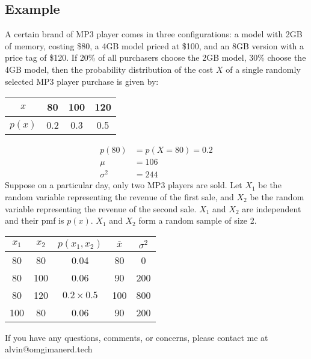 \documentclass[letterpaper, 12pt]{math}
\begin{document}
\subsection*{Example}
A certain brand of MP3 player comes in three configurations: a model with 2GB
of memory, costing \$80, a 4GB model priced at \$100, and an 8GB version with
a price tag of \$120. If 20\% of all purchasers choose the 2GB model, 30\%
choose the 4GB model, then the probability distribution of the cost \( X \) of
a single randomly selected MP3 player purchase is given by:
\begin{center}
  \begin{tabular}{|c|c|c|c|}
    \hline
    \( x \) & 80 & 100 & 120 \\
    \hline
    \( p(x) \) & 0.2 & 0.3 & 0.5 \\
    \hline
  \end{tabular}
\end{center}
\begin{align*}
  p(80) &= p(X=80) = 0.2 \\
  \mu &= 106 \\
  \sigma^{2} &= 244
\end{align*}
Suppose on a particular day, only two MP3 players are sold. Let \( X_{1} \) be
the random variable representing the revenue of the first sale, and \( X_{2} \)
be the random variable representing the revenue of the second sale. \( X_{1} \)
and \( X_{2} \) are independent and their pmf is \( p(x) \). \( X_{1} \) and
\( X_{2} \) form a random sample of size 2.
\begin{center}
  \begin{tabular}{|c|c|c|c|c|}
    \hline
    \( x_{1} \) & \( x_{2} \) & \( p(x_{1},x_{2}) \) & \( \overline{x} \) &
      \( \sigma^{2} \) \\
    \hline
    80 & 80 & 0.04 & 80 & 0 \\
    \hline
    80 & 100 & 0.06 & 90 & 200 \\
    \hline
    80 & 120 & \( 0.2\times0.5 \) & 100 & 800 \\
    \hline
    100 & 80 & 0.06 & 90 & 200 \\
    \hline
  \end{tabular}
\end{center}

\begin{center}
  If you have any questions, comments, or concerns, please contact me at
  alvin@omgimanerd.tech
\end{center}
\end{document}

